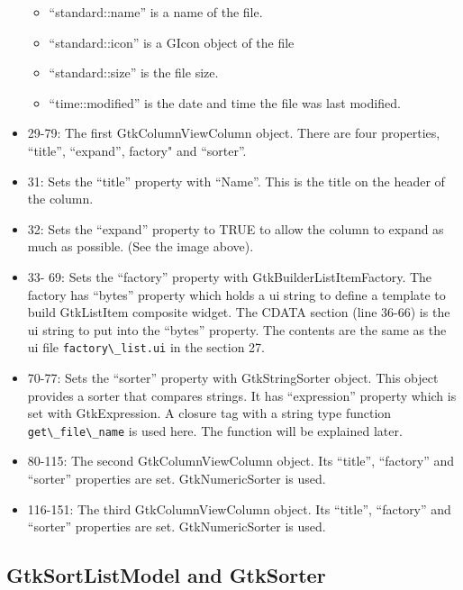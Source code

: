 \begin{itemize}
  \begin{itemize}
  \tightlist
  \item
    ``standard::name'' is a name of the file.
  \item
    ``standard::icon'' is a GIcon object of the file
  \item
    ``standard::size'' is the file size.
  \item
    ``time::modified'' is the date and time the file was last modified.
  \end{itemize}
\item
  29-79: The first GtkColumnViewColumn object. There are four
  properties, ``title'', ``expand'', factory" and ``sorter''.
\item
  31: Sets the ``title'' property with ``Name''. This is the title on
  the header of the column.
\item
  32: Sets the ``expand'' property to TRUE to allow the column to expand
  as much as possible. (See the image above).
\item
  33- 69: Sets the ``factory'' property with GtkBuilderListItemFactory.
  The factory has ``bytes'' property which holds a ui string to define a
  template to build GtkListItem composite widget. The CDATA section
  (line 36-66) is the ui string to put into the ``bytes'' property. The
  contents are the same as the ui file
  \passthrough{\lstinline!factory\_list.ui!} in the section 27.
\item
  70-77: Sets the ``sorter'' property with GtkStringSorter object. This
  object provides a sorter that compares strings. It has ``expression''
  property which is set with GtkExpression. A closure tag with a string
  type function \passthrough{\lstinline!get\_file\_name!} is used here.
  The function will be explained later.
\item
  80-115: The second GtkColumnViewColumn object. Its ``title'',
  ``factory'' and ``sorter'' properties are set. GtkNumericSorter is
  used.
\item
  116-151: The third GtkColumnViewColumn object. Its ``title'',
  ``factory'' and ``sorter'' properties are set. GtkNumericSorter is
  used.
\end{itemize}

\hypertarget{gtksortlistmodel-and-gtksorter}{%
\subsection{GtkSortListModel and
GtkSorter}\label{gtksortlistmodel-and-gtksorter}}

